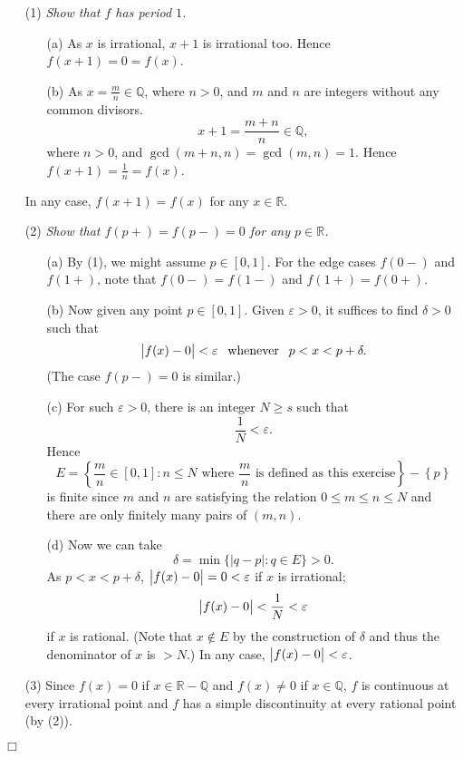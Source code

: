 \documentclass{article}
\begin{document}
\begin{enumerate}
\item[(1)]
\emph{Show that $f$ has period $1$.}
  \begin{enumerate}
  \item[(a)]
  As $x$ is irrational, $x+1$ is irrational too.
  Hence $f(x+1) = 0 = f(x)$.

  \item[(b)]
  As $x = \frac{m}{n} \in \mathbb{Q}$, where $n > 0$,
  and $m$ and $n$ are integers without any common divisors.
  \[
    x+1 = \frac{m+n}{n} \in \mathbb{Q},
  \]
  where $n > 0$, and $\gcd(m+n,n) = \gcd(m,n) = 1$.
  Hence $f(x+1) = \frac{1}{n} = f(x)$.
  \end{enumerate}
  In any case, $f(x+1) = f(x)$ for any $x \in \mathbb{R}$.

\item[(2)]
\emph{Show that $f(p+) = f(p-) = 0$ for any $p \in \mathbb{R}$.}
\begin{enumerate}
  \item[(a)]
  By (1), we might assume $p \in [0,1]$.
  For the edge cases $f(0-)$ and $f(1+)$,
  note that $f(0-) = f(1-)$ and $f(1+) = f(0+)$.

  \item[(b)]
  Now given any point $p \in [0,1]$.
  Given $\varepsilon > 0$,
  it suffices to find $\delta > 0$ such that
  \[
    \abs{ f(x) - 0 } < \varepsilon
    \:\:\text{ whenever }\:\:
    p < x < p + \delta.
  \]
  (The case $f(p-) = 0$ is similar.)

  \item[(c)]
  For such $\varepsilon > 0$,
  there is an integer $N \geq s$ such that
  \[
    \frac{1}{N} < \varepsilon.
  \]
  Hence
  \[
    E = \left\{ \frac{m}{n} \in [0,1] : n \leq N
      \text{ where $\frac{m}{n}$ is defined as this exercise} \right\}
      - \left\{ p \right\}
  \]
  is finite since $m$ and $n$ are satisfying the relation $0 \leq m \leq n \leq N$
  and there are only finitely many pairs of $(m,n)$.

  \item[(d)]
  Now we can take
  \[
    \delta = \min\{ |q - p| : q \in E \} > 0.
  \]
  As $p < x < p + \delta$,
  $\abs{ f(x) - 0 } = 0 < \varepsilon$ if $x$ is irrational;
  \[
    \abs{ f(x) - 0 } < \frac{1}{N} < \varepsilon
  \]
  if $x$ is rational.
  (Note that $x \not\in E$ by the construction of $\delta$
  and thus the denominator of $x$ is $> N$.)
  In any case, $\abs{ f(x) - 0 } < \varepsilon$.
  \end{enumerate}

\item[(3)]
Since $f(x) = 0$ if $x \in \mathbb{R} - \mathbb{Q}$
and $f(x) \neq 0$ if $x \in \mathbb{Q}$,
$f$ is continuous at every irrational point
and $f$ has a simple discontinuity at every rational point (by (2)).
\end{enumerate}
$\Box$ \\
\end{document}
